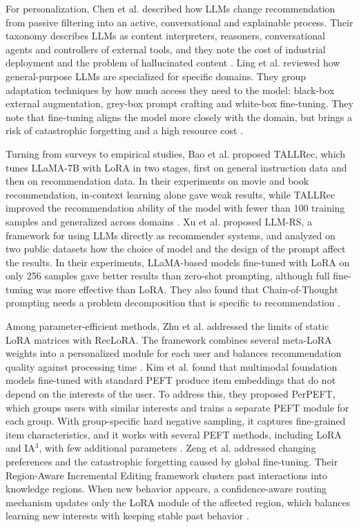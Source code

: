\documentclass[journal,article,submit,pdftex,moreauthors]{Definitions/mdpi}
\begin{document}
For personalization, Chen et al. described how LLMs change recommendation from passive filtering into an active, conversational and explainable process. Their taxonomy describes LLMs as content interpreters, reasoners, conversational agents and controllers of external tools, and they note the cost of industrial deployment and the problem of hallucinated content \citep{chen2024large}. Ling et al. reviewed how general-purpose LLMs are specialized for specific domains. They group adaptation techniques by how much access they need to the model: black-box external augmentation, grey-box prompt crafting and white-box fine-tuning. They note that fine-tuning aligns the model more closely with the domain, but brings a risk of catastrophic forgetting and a high resource cost \citep{ling2025domain}.

Turning from surveys to empirical studies, Bao et al. proposed TALLRec, which tunes LLaMA-7B with LoRA in two stages, first on general instruction data and then on recommendation data. In their experiments on movie and book recommendation, in-context learning alone gave weak results, while TALLRec improved the recommendation ability of the model with fewer than 100 training samples and generalized across domains \citep{bao2023tallrec}. Xu et al. proposed LLM-RS, a framework for using LLMs directly as recommender systems, and analyzed on two public datasets how the choice of model and the design of the prompt affect the results. In their experiments, LLaMA-based models fine-tuned with LoRA on only 256 samples gave better results than zero-shot prompting, although full fine-tuning was more effective than LoRA. They also found that Chain-of-Thought prompting needs a problem decomposition that is specific to recommendation \citep{xu2025tapping}.

Among parameter-efficient methods, Zhu et al. addressed the limits of static LoRA matrices with RecLoRA. The framework combines several meta-LoRA weights into a personalized module for each user and balances recommendation quality against processing time \citep{zhu2024lifelong}. Kim et al. found that multimodal foundation models fine-tuned with standard PEFT produce item embeddings that do not depend on the interests of the user. To address this, they proposed PerPEFT, which groups users with similar interests and trains a separate PEFT module for each group. With group-specific hard negative sampling, it captures fine-grained item characteristics, and it works with several PEFT methods, including LoRA and IA$^3$, with few additional parameters \citep{kim2026personalized}. Zeng et al. addressed changing preferences and the catastrophic forgetting caused by global fine-tuning. Their Region-Aware Incremental Editing framework clusters past interactions into knowledge regions. When new behavior appears, a confidence-aware routing mechanism updates only the LoRA module of the affected region, which balances learning new interests with keeping stable past behavior \citep{zeng2026raie}.
\end{document}
